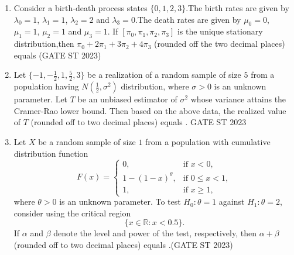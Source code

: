 \documentclass[journal]{IEEEtran}
\begin{document}
\begin{enumerate}[label=\textbf{Q.\arabic*.}, start=1, align=left, itemsep=2em]
\begin{enumerate}[label=\textbf{Q.\arabic*.}, start=11, align=left, itemsep=2em]
\item Consider a birth-death process states $\{0,1,2,3\}$.The birth rates are given by $\lambda_0 = 1$, $\lambda_1 = 1$, $\lambda_2 = 2$ and $\lambda_3=0$.The death rates are given by $\mu_0=0$, $\mu_1=1$, $\mu_2=1$ and $\mu_3=1$. If  $[\pi_0,\pi_1,\pi_2,\pi_3]$ is the unique stationary distribution,then $\pi_0 + 2\pi_1 + 3\pi_2 + 4\pi_3$ (rounded off the two decimal places) equals \underline{\hspace{3cm}}\hfill{(GATE ST 2023)}


\item Let $\{-1, -\frac{1}{2}, 1, \frac{5}{2}, 3\}$ be a realization of a random sample of size $5$ from a population having $N\left(\frac12, \sigma^2\right)$ distribution, where $\sigma > 0$ is an unknown parameter. Let $T$ be an unbiased estimator of $\sigma^2$ whose variance attains the Cramer-Rao lower bound. Then based on the above data, the realized value of $T$ (rounded off to two decimal places) equals \underline{\hspace{2cm}}.
\hspace*{15.7cm}GATE ST 2023

\item Let $X$ be a random sample of size $1$ from a population with cumulative distribution function  
\[
F(x) =
\begin{cases}
0, & \text{if } x < 0, \\
1 - (1-x)^{\theta}, & \text{if } 0 \le x < 1, \\
1, & \text{if } x \ge 1,
\end{cases}
\]
where $\theta > 0$ is an unknown parameter.  
To test $H_0: \theta = 1$ against $H_1: \theta = 2$, consider using the critical region  
\[
\{x \in \mathbb{R} : x < 0.5\}.
\]  
If $\alpha$ and $\beta$ denote the level and power of the test, respectively, then $\alpha + \beta$ (rounded off to two decimal places) equals \underline{\hspace{2cm}}.\hfill(GATE ST 2023)


\end{enumerate}
\end{enumerate}
\end{document}
